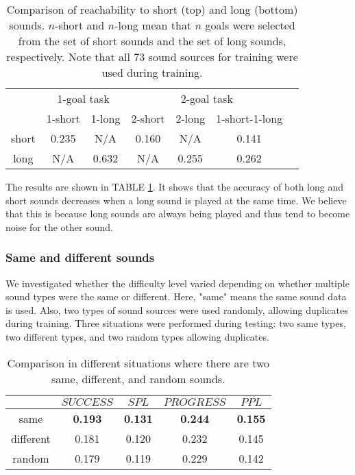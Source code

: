 \begin{table}[tb]
    \centering
    \caption{
        Comparison of reachability to short (top) and long (bottom) sounds.
        $n$-short and $n$-long mean that $n$ goals were selected from the set of short sounds and the set of long sounds, respectively.
        Note that all 73 sound sources for training were used during training.
    }
    \label{tab:long_and_short}
    \begin{tabular}{@{}ccccccc@{}}
    \toprule
      & \multicolumn{2}{c}{1-goal task} & \multicolumn{3}{c}{2-goal task} \\
      \cmidrule(lr){2-3} \cmidrule(lr){4-6}
      & 1-short & 1-long & 2-short & 2-long & 1-short-1-long \\ \midrule
      short & 0.235 & N/A & 0.160 & N/A & 0.141 \\
      long & N/A & 0.632 & N/A & 0.255 & 0.262 \\ \bottomrule
    \end{tabular}
\end{table}

The results are shown in TABLE \ref{tab:long_and_short}.
It shows that the accuracy of both long and short sounds decreases when a long sound is played at the same time.
We believe that this is because long sounds are always being played and thus tend to become noise for the other sound.



\subsubsection{Same and different sounds}

We investigated whether the difficulty level varied depending on whether multiple sound types were the same or different.
Here, "same" 
means the same sound data is used.
Also, two types of sound sources were used randomly, allowing duplicates during training. Three situations were performed during testing: two same types, two different types, and two random types allowing duplicates.

\begin{table}[tb]
    \centering
    \caption{
        Comparison in different situations where there are two same, different, and random sounds.
    }
    \label{tab:same_and_different_sound}
    \begin{tabular}{@{}ccccc@{}}
    \toprule
        & $SUCCESS$ & $SPL$ & $PROGRESS$ & $PPL$ \\ \midrule
        same & \textbf{0.193} & \textbf{0.131} & \textbf{0.244} & \textbf{0.155} \\
        different & 0.181 & 0.120 & 0.232 & 0.145 \\
        random & 0.179 & 0.119 & 0.229 & 0.142  \\ \bottomrule
        \end{tabular}
\end{table}

